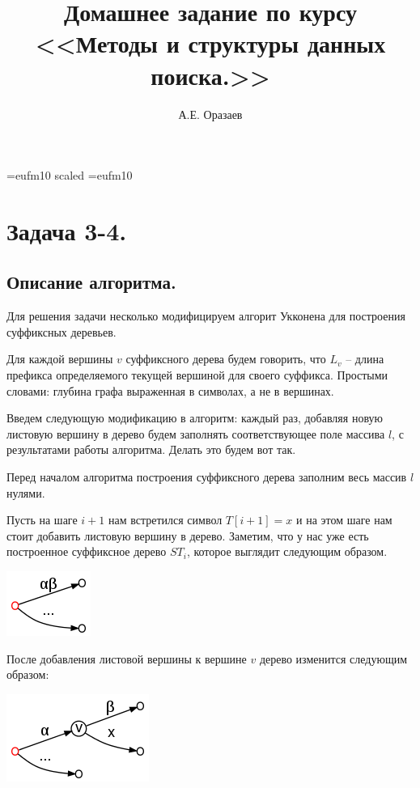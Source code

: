 \documentclass[12pt]{article}
\title{\bf Домашнее задание по курсу \\ <<Методы
и структуры данных поиска.>>}
\author{А.Е. Оразаев}
\date{}
\begin{document}
\voffset=-20mm
\hoffset=-12mm
\font\Got=eufm10 scaled \font\Got=eufm10

\maketitle

\section{Задача 3-4.}
\subsection{Описание алгоритма.}

Для решения задачи несколько модифицируем алгорит Укконена для построения
суффиксных деревьев.

Для каждой вершины $ v $ суффиксного дерева будем говорить, что $ L_{v} $ --
длина префикса определяемого текущей вершиной для своего суффикса. Простыми
словами: глубина графа выраженная в символах, а не в вершинах.

Введем следующую модификацию в алгоритм: каждый раз, добавляя новую
листовую вершину в дерево будем заполнять соответствующее поле массива
$ l $, с результатами работы алгоритма. Делать это будем вот так.

Перед началом алгоритма построения суффиксного дерева заполним весь массив
$ l $ нулями.

Пусть на шаге $ i + 1 $ нам встретился символ $ T[i + 1] = x $ и на
этом шаге нам стоит добавить листовую вершину в дерево. Заметим,
что у нас уже есть построенное суффиксное дерево $ ST_i $, которое выглядит
следующим образом.
\begin{center}
    \includegraphics[width=60bp]{before_addition.png}
\end{center}

После добавления листовой вершины к вершине $ v $ дерево изменится следующим образом:
\begin{center}
    \includegraphics[width=100bp]{after_addition.png}
\end{center}
\end{document}
